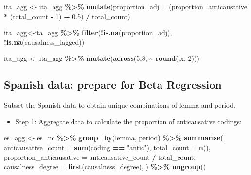 \documentclass[
]{article}
\newenvironment{Shaded}{\begin{snugshade}}{\end{snugshade}}
\newcommand{\AttributeTok}[1]{\textcolor[rgb]{0.13,0.29,0.53}{#1}}
\newcommand{\DecValTok}[1]{\textcolor[rgb]{0.00,0.00,0.81}{#1}}
\newcommand{\FloatTok}[1]{\textcolor[rgb]{0.00,0.00,0.81}{#1}}
\newcommand{\FunctionTok}[1]{\textcolor[rgb]{0.13,0.29,0.53}{\textbf{#1}}}
\newcommand{\NormalTok}[1]{#1}
\newcommand{\OtherTok}[1]{\textcolor[rgb]{0.56,0.35,0.01}{#1}}
\newcommand{\SpecialCharTok}[1]{\textcolor[rgb]{0.81,0.36,0.00}{\textbf{#1}}}
\newcommand{\StringTok}[1]{\textcolor[rgb]{0.31,0.60,0.02}{#1}}
\providecommand{\tightlist}{%
  \setlength{\itemsep}{0pt}\setlength{\parskip}{0pt}}
\begin{document}
\begin{Shaded}
\begin{Highlighting}[]
\NormalTok{ita\_agg }\OtherTok{\textless{}{-}}\NormalTok{ ita\_agg }\SpecialCharTok{\%\textgreater{}\%}
  \FunctionTok{mutate}\NormalTok{(}\AttributeTok{proportion\_adj =}\NormalTok{ (proportion\_anticausative }\SpecialCharTok{*}\NormalTok{ (total\_count }\SpecialCharTok{{-}} \DecValTok{1}\NormalTok{) }\SpecialCharTok{+} \FloatTok{0.5}\NormalTok{) }\SpecialCharTok{/}\NormalTok{ total\_count)}

\NormalTok{ita\_agg}\OtherTok{\textless{}{-}}\NormalTok{ita\_agg }\SpecialCharTok{\%\textgreater{}\%}
  \FunctionTok{filter}\NormalTok{(}\SpecialCharTok{!}\FunctionTok{is.na}\NormalTok{(proportion\_adj), }\SpecialCharTok{!}\FunctionTok{is.na}\NormalTok{(causalness\_lagged))}

\NormalTok{ita\_agg }\OtherTok{\textless{}{-}}\NormalTok{ ita\_agg }\SpecialCharTok{\%\textgreater{}\%}
  \FunctionTok{mutate}\NormalTok{(}\FunctionTok{across}\NormalTok{(}\DecValTok{5}\SpecialCharTok{:}\DecValTok{8}\NormalTok{, }\SpecialCharTok{\textasciitilde{}} \FunctionTok{round}\NormalTok{(.x, }\DecValTok{2}\NormalTok{))) }
\end{Highlighting}
\end{Shaded}

\subsection{Spanish data: prepare for Beta
Regression}\label{spanish-data-prepare-for-beta-regression}

Subset the Spanish data to obtain unique combinations of lemma and
period.

\begin{itemize}
\tightlist
\item
  Step 1: Aggregate data to calculate the proportion of anticausative
  codings:
\end{itemize}

\begin{Shaded}
\begin{Highlighting}[]
\NormalTok{es\_agg }\OtherTok{\textless{}{-}}\NormalTok{ es\_nc }\SpecialCharTok{\%\textgreater{}\%}
  \FunctionTok{group\_by}\NormalTok{(lemma, period) }\SpecialCharTok{\%\textgreater{}\%}
  \FunctionTok{summarise}\NormalTok{(}
    \AttributeTok{anticausative\_count =} \FunctionTok{sum}\NormalTok{(coding }\SpecialCharTok{==} \StringTok{"antic"}\NormalTok{),}
    \AttributeTok{total\_count =} \FunctionTok{n}\NormalTok{(),}
    \AttributeTok{proportion\_anticausative =}\NormalTok{ anticausative\_count }\SpecialCharTok{/}\NormalTok{ total\_count,}
    \AttributeTok{causalness\_degree =} \FunctionTok{first}\NormalTok{(causalness\_degree),}
\NormalTok{    ) }\SpecialCharTok{\%\textgreater{}\%}
  \FunctionTok{ungroup}\NormalTok{()}
\end{Highlighting}
\end{Shaded}
\end{document}
